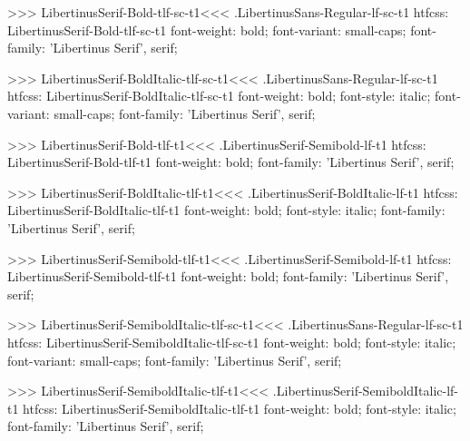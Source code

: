 {{{{>>>
\<LibertinusSerif-Bold-tlf-sc-t1\><<<
.LibertinusSans-Regular-lf-sc-t1
htfcss:  LibertinusSerif-Bold-tlf-sc-t1  font-weight: bold; font-variant: small-caps; font-family: 'Libertinus Serif', serif;

>>>
\<LibertinusSerif-BoldItalic-tlf-sc-t1\><<<
.LibertinusSans-Regular-lf-sc-t1
htfcss:  LibertinusSerif-BoldItalic-tlf-sc-t1  font-weight: bold; font-style: italic; font-variant: small-caps; font-family: 'Libertinus Serif', serif;

>>>
\<LibertinusSerif-Bold-tlf-t1\><<<
.LibertinusSerif-Semibold-lf-t1
htfcss:  LibertinusSerif-Bold-tlf-t1  font-weight: bold; font-family: 'Libertinus Serif', serif;

>>>
\<LibertinusSerif-BoldItalic-tlf-t1\><<<
.LibertinusSerif-BoldItalic-lf-t1
htfcss:  LibertinusSerif-BoldItalic-tlf-t1  font-weight: bold; font-style: italic; font-family: 'Libertinus Serif', serif;

>>>
\<LibertinusSerif-Semibold-tlf-t1\><<<
.LibertinusSerif-Semibold-lf-t1
htfcss:  LibertinusSerif-Semibold-tlf-t1  font-weight: bold; font-family: 'Libertinus Serif', serif;

>>>
\<LibertinusSerif-SemiboldItalic-tlf-sc-t1\><<<
.LibertinusSans-Regular-lf-sc-t1
htfcss:  LibertinusSerif-SemiboldItalic-tlf-sc-t1  font-weight: bold; font-style: italic; font-variant: small-caps; font-family: 'Libertinus Serif', serif;

>>>
\<LibertinusSerif-SemiboldItalic-tlf-t1\><<<
.LibertinusSerif-SemiboldItalic-lf-t1
htfcss:  LibertinusSerif-SemiboldItalic-tlf-t1  font-weight: bold; font-style: italic; font-family: 'Libertinus Serif', serif;

}}}}
